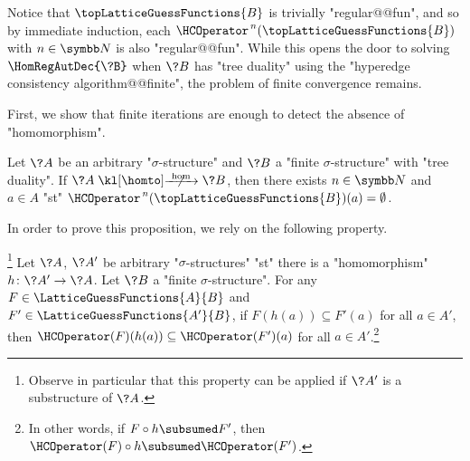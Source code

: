 Notice that $\topLatticeGuessFunctions{B}$ is trivially "regular@@fun", and so
by immediate induction, each $\HCOperator^{\,n}(\topLatticeGuessFunctions{B})$ with $n\in \N$ is
also "regular@@fun". While this opens the door to solving $\HomRegAutDec{\?B}$ when $\?B$ has
"tree duality" using the "hyperedge consistency algorithm@@finite", the problem
of finite convergence remains.

First, we show that finite iterations are enough to detect the absence of "homomorphism".
\begin{proposition}
	\AP\label{prop:hyperedge-consistency-no-hom}
	Let $\?A$ be an arbitrary "$\sigma$-structure" and $\?B$ a "finite $\sigma$-structure"
	with "tree duality". If $\?A \nothomto \?B$, then there exists $n\in\N$ and $a\in A$ "st"
	$\HCOperator^{\,n}(\topLatticeGuessFunctions{B})(a) = \emptyset$. 
\end{proposition}

In order to prove this proposition, we rely on the following property.
\begin{property}
	\!\footnote{Observe in particular that this property can be applied if $\?A'$ is a
	substructure of $\?A$.}%
	\AP\label{prop:hyperedge-consistency-antimonotonicity}
	Let $\?A$, $\?A'$ be arbitrary "$\sigma$-structures" "st"
	there is a "homomorphism" $h\colon \?A' \to \?A$. Let $\?B$ a "finite $\sigma$-structure".
	For any $F\in \LatticeGuessFunctions{A}{B}$ and $F' \in \LatticeGuessFunctions{A'}{B}$,
	if $F(h(a)) \subseteq F'(a)$ for all $a\in A'$, then $\HCOperator(F)(h(a)) \subseteq \HCOperator(F')(a)$ for all $a\in A'$.\footnote{In other words, if $F \circ h \subsumed F'$, then
	$\HCOperator(F) \circ h \subsumed \HCOperator(F')$.}
\end{property}

